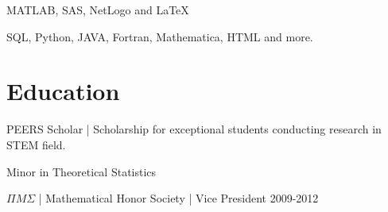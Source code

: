 \documentclass[letterpaper]{deedy-resume} %
\begin{document}
\vspace{\topsep}
\vspace{\topsep}
\vspace{\topsep}
  \begin{tightitemize}
    \item  MATLAB, SAS, NetLogo and LaTeX
  \end{tightitemize}
\vspace{\topsep}
\vspace{\topsep}
\vspace{\topsep}
  \begin{tightitemize}
  	\item SQL, Python, JAVA, Fortran, Mathematica, HTML and more.
  \end{tightitemize}
\sectionspace

\noindent\makebox[\linewidth]{\rule{\paperwidth}{0.4pt}}

\section{Education} 
\vspace{\topsep}

\descript{}
\vspace{\topsep}


\vspace{\topsep}
\begin{tightitemize}
	 \item  PEERS Scholar | Scholarship for exceptional students conducting research in STEM field.
\end{tightitemize}

\vspace{\topsep}

Minor in Theoretical Statistics \\
\vspace{\topsep}
\begin{tightitemize}
	 \item $\Pi M \Sigma$ | Mathematical Honor Society | Vice President 2009-2012
\end{tightitemize}


\noindent\makebox[\linewidth]{\rule{\paperwidth}{0.4pt}}
\sectionspace
\end{document}
